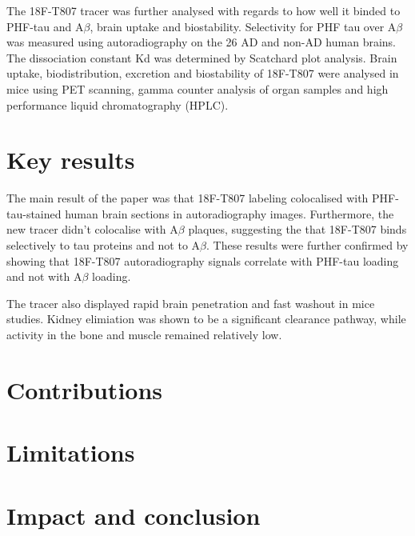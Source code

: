 \documentclass[11pt,a4paper,oneside]{report}
\begin{document}
The 18F-T807 tracer was further analysed with regards to how well it binded to PHF-tau and A$\beta$, brain uptake and biostability. Selectivity for PHF tau over A$\beta$ was measured using autoradiography on the 26 AD and non-AD human brains. The dissociation constant Kd was determined by Scatchard plot analysis. Brain uptake, biodistribution, excretion and biostability of 18F-T807 were analysed in mice using PET scanning, gamma counter analysis of organ samples and high performance liquid chromatography (HPLC).


\section*{Key results}

The main result of the paper was that 18F-T807 labeling colocalised with PHF-tau-stained human brain sections in autoradiography images. Furthermore, the new tracer didn't colocalise with A$\beta$ plaques, suggesting the that 18F-T807 binds selectively to tau proteins and not to A$\beta$. These results were further confirmed by showing that 18F-T807 autoradiography signals correlate with PHF-tau loading and not with A$\beta$ loading. 

The tracer also displayed rapid brain penetration and fast washout in mice studies. Kidney elimiation was shown to be a significant clearance pathway, while activity in the bone and muscle remained relatively low.



\section*{Contributions}


\section*{Limitations}



\section*{Impact and conclusion}



\nocite{*} %


\end{document}
